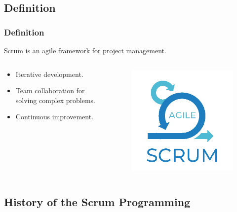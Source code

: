 \documentclass[
	11pt, %
]{beamer}
\begin{document}

\subsection{Definition}
\begin{frame}
	\frametitle{Definition}
	Scrum is an agile framework for project management.

	\begin{columns}[c] %
		\begin{column}{0.45\textwidth} %
			\begin{itemize} %
				\item Iterative development.
				\item Team collaboration for solving complex problems.
				\item Continuous improvement.
			\end{itemize}
		\end{column}
		\begin{column}{0.5\textwidth} %
			\begin{figure}
				\includegraphics[width=0.7\linewidth]{scrum-logo.png}
			\end{figure}
		\end{column}
	\end{columns}

\end{frame}

\subsection{History of the Scrum Programming}
\end{document}
